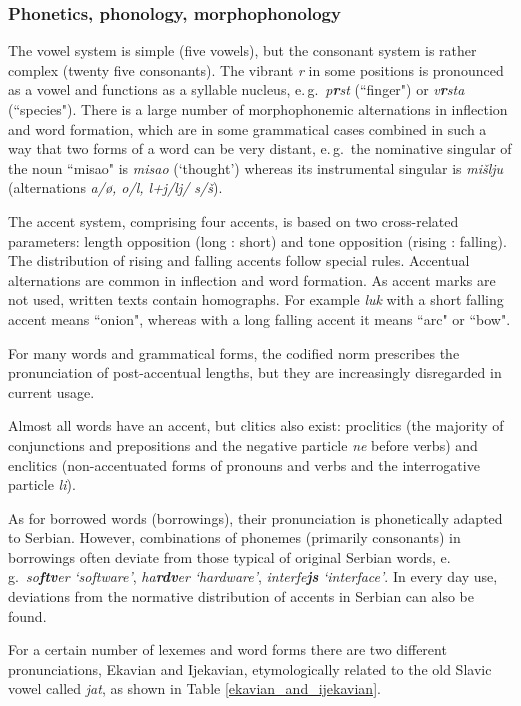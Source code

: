\begin{multicols}{2}
\subsubsection {Phonetics, phonology, morphophonology}

The vowel system is simple (five vowels), but the consonant system is rather complex (twenty five consonants). The vibrant \textit{r} in some positions is pronounced as a vowel and functions as a syllable nucleus, e.\,g.~\textit{p\textbf{r}st} (``finger") or \textit{v\textbf{r}sta} (``species"). There is a large number of morphophonemic alternations in inflection and word formation, which are in some grammatical cases combined in such a way that two forms of a word can be very distant, e.\,g.~the nominative singular of the noun ``misao" is \textit{misao} (‘thought’) whereas its instrumental singular is \textit{mišlju} (alternations \textit{a/\o{}, o/l, l+j/lj/ s/š}).

The accent system, comprising four accents, is based on two cross-related parameters: length opposition (long : short) and tone opposition (rising : falling). The distribution of rising and falling accents follow special rules. Accentual alternations are common in inflection and word formation. As accent marks are not used, written texts contain homographs. For example \textit{luk} with a short falling accent means ``onion", whereas with a long falling accent it means ``arc" or ``bow". 

For many words and grammatical forms, the codified norm prescribes the pronunciation of post-accentual lengths, but they are increasingly disregarded in current usage.

Almost all words have an accent, but clitics also exist: proclitics (the majority of conjunctions and prepositions and the negative particle \textit{ne} before verbs) and enclitics (non-accentuated forms of pronouns and verbs and the interrogative particle \textit{li}). 

As for borrowed words (borrowings), their pronunciation is phonetically adapted to Serbian. However, combinations of phonemes (primarily consonants) in borrowings often deviate from those typical of original Serbian words, e.\,g.~\textit{so\textbf{ftv}er} \textit{‘software’}, \textit{ha\textbf{rdv}er} \textit{‘hardware’}, \textit{interfe\textbf{js}} \textit{‘interface’}. In every day use, deviations from the normative distribution of accents in Serbian can also be found. 

For a certain number of lexemes and word forms there are two different pronunciations, Ekavian and Ijekavian, etymologically related to the old Slavic vowel called \textit{jat}, as shown in Table \ref{ekavian_and_ijekavian}. 


\end{multicols}

